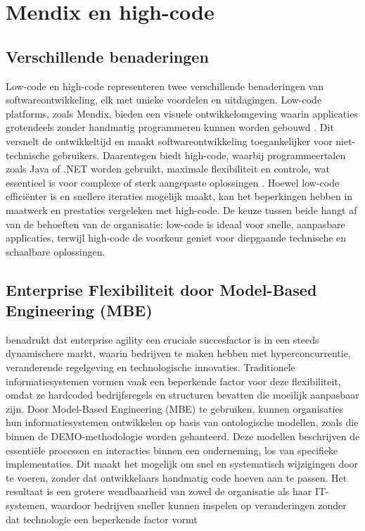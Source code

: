 \section{Mendix en high-code}
\subsection{Verschillende benaderingen}
Low-code en high-code representeren twee verschillende benaderingen van softwareontwikkeling, elk met unieke voordelen en uitdagingen. Low-code platforms, zoals Mendix, bieden een visuele ontwikkelomgeving waarin applicaties grotendeels zonder handmatig programmeren kunnen worden gebouwd \autocite{Krouwel_2022}. Dit versnelt de ontwikkeltijd en maakt softwareontwikkeling toegankelijker voor niet-technische gebruikers. Daarentegen biedt high-code, waarbij programmeertalen zoals Java of .NET worden gebruikt, maximale flexibiliteit en controle, wat essentieel is voor complexe of sterk aangepaste oplossingen \autocite{Krouwel_2022}. Hoewel low-code efficiënter is en snellere iteraties mogelijk maakt, kan het beperkingen hebben in maatwerk en prestaties vergeleken met high-code. De keuze tussen beide hangt af van de behoeften van de organisatie: low-code is ideaal voor snelle, aanpasbare applicaties, terwijl high-code de voorkeur geniet voor diepgaande technische en schaalbare oplossingen.

\subsection{Enterprise Flexibiliteit door Model-Based Engineering (MBE)}
\textcite{Krouwel_2022} benadrukt dat enterprise agility een cruciale succesfactor is in een steeds dynamischere markt, waarin bedrijven te maken hebben met hyperconcurrentie, veranderende regelgeving en technologische innovaties. Traditionele informatiesystemen vormen vaak een beperkende factor voor deze flexibiliteit, omdat ze hardcoded bedrijfsregels en structuren bevatten die moeilijk aanpasbaar zijn. Door Model-Based Engineering (MBE) te gebruiken, kunnen organisaties hun informatiesystemen ontwikkelen op basis van ontologische modellen, zoals die binnen de DEMO-methodologie worden gehanteerd. Deze modellen beschrijven de essentiële processen en interacties binnen een onderneming, los van specifieke implementaties. Dit maakt het mogelijk om snel en systematisch wijzigingen door te voeren, zonder dat ontwikkelaars handmatig code hoeven aan te passen. Het resultaat is een grotere wendbaarheid van zowel de organisatie als haar IT-systemen, waardoor bedrijven sneller kunnen inspelen op veranderingen zonder dat technologie een beperkende factor vormt

